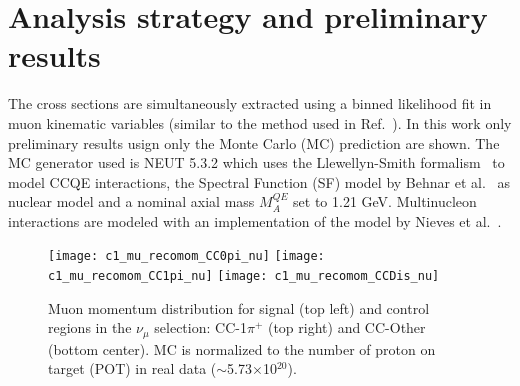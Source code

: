 \documentclass[12pt]{article}
\begin{document}
\section{Analysis strategy and preliminary results }

The cross sections are simultaneously extracted using a binned likelihood fit in muon kinematic variables (similar to the method used in Ref.~\cite{t2kcc0pi}). In this work only preliminary results usign only the Monte Carlo (MC) prediction are shown. The MC generator used is NEUT 5.3.2 which uses the Llewellyn-Smith formalism~\cite{llewellyn-smith} to model CCQE interactions, the Spectral Function (SF) model by Behnar et al.~\cite{benhar} as nuclear model and a nominal axial mass $M_A^{QE}$ set to 1.21 GeV.  Multinucleon interactions are modeled with an implementation of the model by Nieves et al.~\cite{nieves2011}.
\begin{figure}[htbp]
	\centering
	\texttt{[image: c1\_mu\_recomom\_CC0pi\_nu]}
	\texttt{[image: c1\_mu\_recomom\_CC1pi\_nu]}
	\texttt{[image: c1\_mu\_recomom\_CCDis\_nu]}
	\caption{Muon momentum distribution for signal (top left) and control regions in the $\nu_\mu$ selection: CC-1$\pi^+$ (top right) and CC-Other (bottom center). MC is normalized to the number of proton on target (POT) in real data ($\sim$5.73$\times$10$^{20}$).}\label{numu}
\end{figure}
\end{document}
